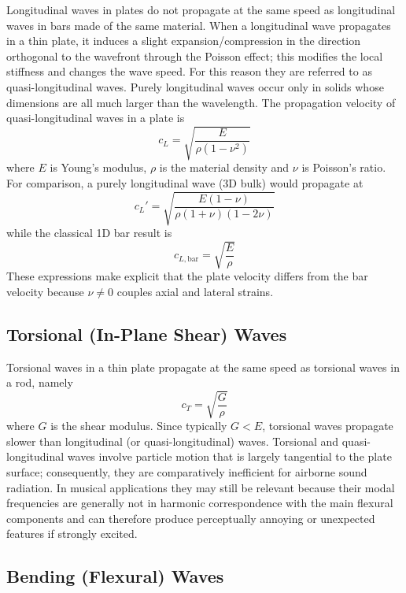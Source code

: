 Longitudinal waves in plates do not propagate at the same speed as longitudinal waves in bars made of the same material. When a longitudinal wave propagates in a thin plate, it induces a slight expansion/compression in the direction orthogonal to the wavefront through the Poisson effect; this modifies the local stiffness and changes the wave speed. For this reason they are referred to as quasi-longitudinal waves. Purely longitudinal waves occur only in solids whose dimensions are all much larger than the wavelength. The propagation velocity of quasi-longitudinal waves in a plate is
\[
c_L = \sqrt{\frac{E}{\rho(1-\nu^{2})}}
\]
where \( E \) is Young's modulus, \( \rho \) is the material density and \( \nu \) is Poisson's ratio. For comparison, a purely longitudinal wave (3D bulk) would propagate at
\[
c_L' = \sqrt{\frac{E(1-\nu)}{\rho(1+\nu)(1-2\nu)}}
\]
while the classical 1D bar result is
\[
c_{L,\mathrm{bar}} = \sqrt{\frac{E}{\rho}}
\]
These expressions make explicit that the plate velocity differs from the bar velocity because \( \nu\neq 0 \) couples axial and lateral strains. 

\subsection{Torsional (In-Plane Shear) Waves}

Torsional waves in a thin plate propagate at the same speed as torsional waves in a rod, namely
\[
c_T = \sqrt{\frac{G}{\rho}}
\]
where \( G \) is the shear modulus. Since typically \( G<E \), torsional waves propagate slower than longitudinal (or quasi-longitudinal) waves. Torsional and quasi-longitudinal waves involve particle motion that is largely tangential to the plate surface; consequently, they are comparatively inefficient for airborne sound radiation. In musical applications they may still be relevant because their modal frequencies are generally not in harmonic correspondence with the main flexural components and can therefore produce perceptually annoying or unexpected features if strongly excited.

\subsection{Bending (Flexural) Waves}

